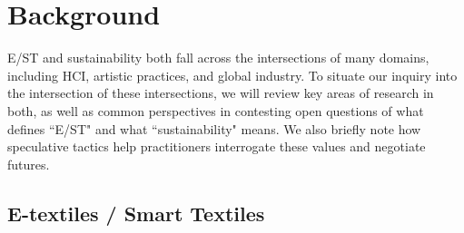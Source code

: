 \documentclass[manuscript,review,anonymous]{acmart}
\begin{document}



\section{Background}

E/ST and sustainability both fall across the intersections of many domains, including HCI, artistic practices, and global industry. To situate our inquiry into the intersection of these intersections, we will review key areas of research in both, as well as common perspectives in contesting open questions of what defines ``E/ST" and what ``sustainability" means. We also briefly note how speculative tactics help practitioners interrogate these values and negotiate futures.

\subsection{E-textiles / Smart Textiles}
\end{document}
